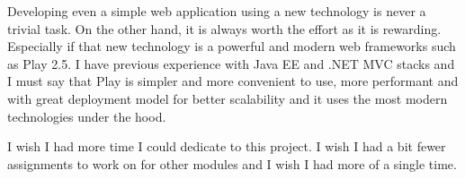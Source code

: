\documentclass[12pt,twoside,a4paper]{report}
\begin{document}
Developing even a simple web application using a new technology is never a trivial task. On the other hand, it is always worth the effort as it is rewarding. Especially if that new technology is a powerful and modern web frameworks such as Play 2.5. I have previous experience with Java EE and .NET MVC stacks and I must say that Play is simpler and more convenient to use, more performant and with great deployment model for better scalability and it uses the most modern technologies under the hood.

I wish I had more time I could dedicate to this project. I wish I had a bit fewer assignments to work on for other modules and I wish I had more of a single time.


\end{document}
